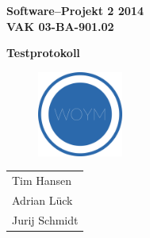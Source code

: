 \documentclass[fontsize=12pt,paper=a4,twoside]{scrartcl}
\begin{document}
  \thispagestyle{fancy}
  \fancyhead[LO,RE]{ }
  \fancyfoot[C]{}

  \vspace{3cm}

  \begin{minipage}[H]{\textwidth}
  \begin{center}
  \bf
  \Large
  Software--Projekt 2 2014\\
  \smallskip
  \small
  VAK 03-BA-901.02\\
  \vspace{3cm}
  \end{center}
  \end{minipage}
  \begin{minipage}[H]{\textwidth}
  \begin{center}
  \vspace{1cm}
  \bf
  \Large Testprotokoll\\
  \vspace{3ex}
   	  \begin{figure}[H]
      \centering
      \includegraphics[width=0.25\textwidth]{../WOYM.png}
      \end{figure}
  \vfill
  \end{center}
  \end{minipage}
  \vfill
  \begin{minipage}[H]{\textwidth}
  \begin{center}
  \sf
  \begin{tabular}{l}
  Tim Hansen \\
  Adrian Lück \\
  Jurij Schmidt\\
  \end{tabular}

  \end{center}
  \end{minipage}

\end{document}
